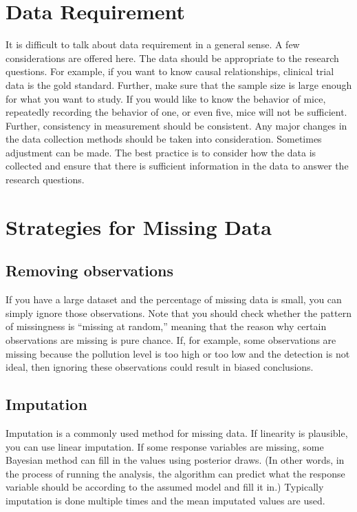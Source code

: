 \documentclass[
]{book}
\begin{document}
\hypertarget{data-requirement}{%
\section{Data Requirement}\label{data-requirement}}

It is difficult to talk about data requirement in a general sense. A few considerations are offered here. The data should be appropriate to the research questions. For example, if you want to know causal relationships, clinical trial data is the gold standard. Further, make sure that the sample size is large enough for what you want to study. If you would like to know the behavior of mice, repeatedly recording the behavior of one, or even five, mice will not be sufficient. Further, consistency in measurement should be consistent. Any major changes in the data collection methods should be taken into consideration. Sometimes adjustment can be made. The best practice is to consider how the data is collected and ensure that there is sufficient information in the data to answer the research questions.

\hypertarget{strategies-for-missing-data}{%
\section{Strategies for Missing Data}\label{strategies-for-missing-data}}

\hypertarget{removing-observations}{%
\subsection{Removing observations}\label{removing-observations}}

If you have a large dataset and the percentage of missing data is small, you can simply ignore those observations. Note that you should check whether the pattern of missingness is ``missing at random,'' meaning that the reason why certain observations are missing is pure chance. If, for example, some observations are missing because the pollution level is too high or too low and the detection is not ideal, then ignoring these observations could result in biased conclusions.

\hypertarget{imputation}{%
\subsection{Imputation}\label{imputation}}

Imputation is a commonly used method for missing data. If linearity is plausible, you can use linear imputation. If some response variables are missing, some Bayesian method can fill in the values using posterior draws. (In other words, in the process of running the analysis, the algorithm can predict what the response variable should be according to the assumed model and fill it in.) Typically imputation is done multiple times and the mean imputated values are used.
\end{document}
